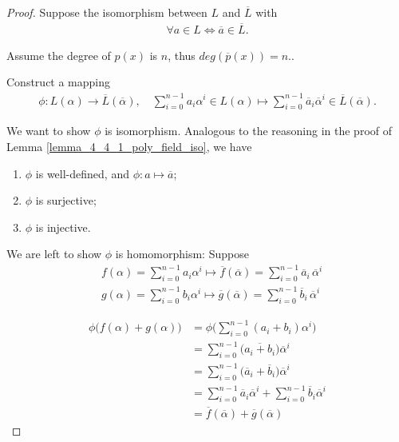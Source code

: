 \documentclass[utf8]{ctexbook}
\begin{document}
\begin{proof}
Suppose the isomorphism between $L$ and $\overline{L}$ with
\begin{align*}
\forall a \in L \iff \overline{a} \in \overline{L} .
\end{align*}

Assume the degree of $p(x)$ is $n$, thus $deg(\overline{p} (x) ) = n$..

Construct a mapping
\begin{align*}
\phi : L(\alpha) \longrightarrow \overline{L} (\overline{\alpha}), \quad \sum_{i=0} ^{n-1} a_i \alpha^i \in L(\alpha) \mapsto \sum_{i=0} ^{n-1} \overline{a}_i \overline{\alpha}^i \in \overline{L} (\overline{\alpha}).
\end{align*}

We want to show $\phi$ is isomorphism. Analogous to the reasoning in the proof of Lemma \ref{lemma_4_4_1_poly_field_iso}, we have
\begin{enumerate}
\item{$\phi$ is well-defined, and $\phi: a \mapsto \overline{a}$;}
\item{$\phi$ is surjective;}
\item{$\phi$ is injective.}
\end{enumerate}

We are left to show $\phi$ is homomorphism: Suppose
\begin{align*}
& f(\alpha) = \sum_{i=0} ^{n-1} a_i \alpha^i  \mapsto \overline{f} ( \overline{\alpha} ) = \sum_{i=0} ^{n-1} \overline{a}_i \, \overline{\alpha}^i \\
& g(\alpha) = \sum_{i=0} ^{n-1} b_i \alpha^i  \mapsto \overline{g} (\overline{\alpha}) = \sum_{i=0} ^{n-1} \overline{b}_i \, \overline{\alpha}^i  
\end{align*}

\begin{align*}
\phi \big(f( \alpha ) + g( \alpha) \big) &= \phi\big( \sum_{i=0} ^{n-1} (a_i + b_i) \alpha^i   \big) \\
&= \sum_{i=0} ^{n-1}\big( \overline{a_i + b_i} \big) \overline{\alpha}^i \\
&=  \sum_{i=0} ^{n-1} \big( \overline{a}_i + \overline{b}_i \big) \overline{\alpha}^i \\
&= \sum_{i=0} ^{n-1} \overline{a}_i \overline{\alpha}^i + \sum_{i=0} ^{n-1} \overline{b}_i \overline{\alpha}^i  \\
&= \overline{f} (\overline{\alpha} ) + \overline{g} ( \overline{\alpha})
\end{align*} 


\end{proof}
\end{document}
